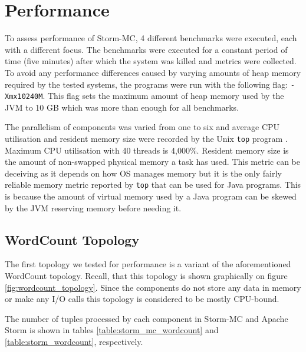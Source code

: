 \section{Performance}
\label{sec:performance}

To assess performance of Storm-MC, 4 different benchmarks were executed, each with a different focus. The benchmarks were executed for a constant period of time (five minutes) after which the system was killed and metrics were collected. To avoid any performance differences caused by varying amounts of heap memory required by the tested systems, the programs were run with the following flag: \texttt{-Xmx10240M}. This flag sets the maximum amount of heap memory used by the JVM to 10 GB which was more than enough for all benchmarks.

The parallelism of components was varied from one to six and average CPU utilisation and resident memory size were recorded by the Unix \texttt{top} program \citep{UnixTop}. Maximum CPU utilisation with 40 threads is 4,000\%. Resident memory size is the amount of non-swapped physical memory a task has used. This metric can be deceiving as it depends on how OS manages memory but it is the only fairly reliable memory metric reported by \texttt{top} that can be used for Java programs. This is because the amount of virtual memory used by a Java program can be skewed by the JVM reserving memory before needing it.

\subsection{WordCount Topology}

The first topology we tested for performance is a variant of the aforementioned WordCount topology. Recall, that this topology is shown graphically on figure \ref{fig:wordcount_topology}. Since the components do not store any data in memory or make any I/O calls this topology is considered to be mostly CPU-bound.

The number of tuples processed by each component in Storm-MC and Apache Storm is shown in tables \ref{table:storm_mc_wordcount} and \ref{table:storm_wordcount}, respectively.

